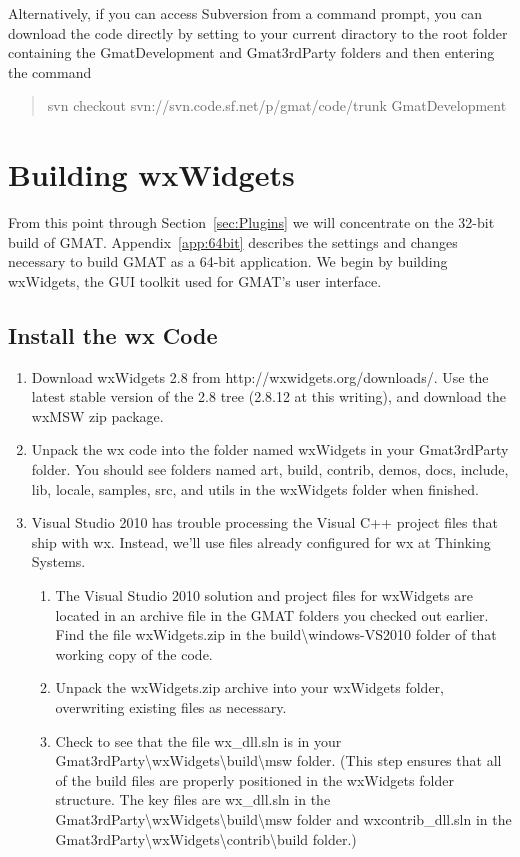 \documentclass[letterpaper,10pt]{article}%
\begin{document}
{Alternatively, if you can access Subversion from a command prompt, you can download the code directly by setting to your current diractory to the root folder containing the GmatDevelopment and Gmat3rdParty folders and then entering the command
\begin{quote}
svn checkout svn://svn.code.sf.net/p/gmat/code/trunk GmatDevelopment
\end{quote}

\section{Building wxWidgets}

From this point through Section~\ref{sec:Plugins} we will concentrate on the 32-bit build of GMAT.  Appendix~\ref{app:64bit} describes the settings and changes necessary to build GMAT as a 64-bit application.  We begin by building wxWidgets, the GUI toolkit used for GMAT's user interface.

\subsection{Install the wx Code}

\begin{enumerate}
\item Download wxWidgets 2.8 from http://wxwidgets.org/downloads/.  Use the latest stable version of the 2.8 tree (2.8.12 at this writing), and download the wxMSW zip package.
\item Unpack the wx code into the folder named wxWidgets in your Gmat3rdParty folder.  You should see folders named art, build, contrib, demos, docs, include, lib, locale, samples, src, and utils in the wxWidgets folder when finished.
\item Visual Studio 2010 has trouble processing the Visual C++ project files that ship with wx.  Instead, we'll use files already configured for wx at Thinking Systems.
\begin{enumerate}
\item The Visual Studio 2010 solution and project files for wxWidgets are located in an archive file in the GMAT folders you checked out earlier.  Find the file wxWidgets.zip in the build\textbackslash windows-VS2010 folder of that working copy of the code.
\item Unpack the wxWidgets.zip archive into your wxWidgets folder, overwriting existing files as necessary.
\item Check to see that the file wx\_dll.sln is in your Gmat3rdParty\textbackslash wxWidgets\textbackslash build\textbackslash msw folder.  (This step ensures that all of the build files are properly positioned in the wxWidgets folder structure.  The key files are wx\_dll.sln in the Gmat3rdParty\textbackslash wxWidgets\textbackslash build\textbackslash msw folder and wxcontrib\_dll.sln in the Gmat3rdParty\textbackslash wxWidgets\textbackslash contrib\textbackslash build folder.)
\end{enumerate}


\end{enumerate}}
\end{document}
